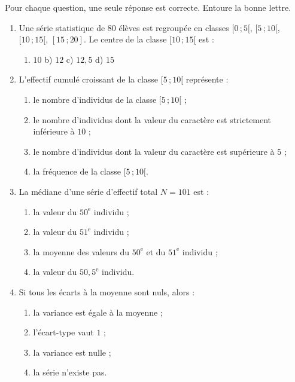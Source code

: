 \documentclass[11pt]{article}
\begin{document}
\begin{exercice}
Pour chaque question, une seule réponse est correcte. Entoure la bonne lettre.
\begin{enumerate}
\item Une série statistique de 80 élèves est regroupée en classes $[0\,; 5[$, $[5\,; 10[$, $[10\,; 15[$, $[15\,; 20]$. Le centre de la classe $[10\,; 15[$ est :
\begin{enumerate}
\item[a)] $10$ \quad b) $12$ \quad c) $12,5$ \quad d) $15$
\end{enumerate}
\item L'effectif cumulé croissant de la classe $[5\,; 10[$ représente :
\begin{enumerate}
\item[a)] le nombre d'individus de la classe $[5\,; 10[$ ;
\item[b)] le nombre d'individus dont la valeur du caractère est strictement inférieure à $10$ ;
\item[c)] le nombre d'individus dont la valeur du caractère est supérieure à $5$ ;
\item[d)] la fréquence de la classe $[5\,; 10[$.
\end{enumerate}
\item La médiane d'une série d'effectif total $N = 101$ est :
\begin{enumerate}
\item[a)] la valeur du $50^{\text{e}}$ individu ;
\item[b)] la valeur du $51^{\text{e}}$ individu ;
\item[c)] la moyenne des valeurs du $50^{\text{e}}$ et du $51^{\text{e}}$ individu ;
\item[d)] la valeur du $50,5^{\text{e}}$ individu.
\end{enumerate}
\item Si tous les écarts à la moyenne sont nuls, alors :
\begin{enumerate}
\item[a)] la variance est égale à la moyenne ;
\item[b)] l'écart-type vaut $1$ ;
\item[c)] la variance est nulle ;
\item[d)] la série n'existe pas.
\end{enumerate}
\end{enumerate}
\end{exercice}
\end{document}
